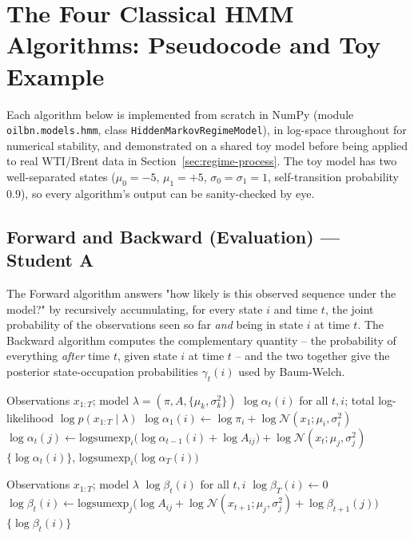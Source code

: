\section{The Four Classical HMM Algorithms: Pseudocode and Toy Example}
\label{sec:algorithms}

Each algorithm below is implemented from scratch in NumPy (module
\texttt{oilbn.models.hmm}, class \texttt{HiddenMarkovRegimeModel}), in
log-space throughout for numerical stability, and demonstrated on a
shared toy model before being applied to real WTI/Brent data in
Section~\ref{sec:regime-process}. The toy model has two well-separated states
($\mu_0=-5$, $\mu_1=+5$, $\sigma_0=\sigma_1=1$, self-transition
probability $0.9$), so every algorithm's output can be sanity-checked by
eye.

\subsection{Forward and Backward (Evaluation) --- Student A}

The Forward algorithm answers "how likely is this observed sequence
under the model?" by recursively accumulating, for every state $i$ and
time $t$, the joint probability of the observations seen so far
\emph{and} being in state $i$ at time $t$. The Backward algorithm
computes the complementary quantity -- the probability of everything
\emph{after} time $t$, given state $i$ at time $t$ -- and the two
together give the posterior state-occupation probabilities
$\gamma_t(i)$ used by Baum-Welch.

\begin{algorithm}[H]
\caption{Forward algorithm (log-space)}
\begin{algorithmic}[1]
\Require Observations $x_{1:T}$; model $\lambda = (\pi, A, \{\mu_k,\sigma_k^2\})$
\Ensure $\log\alpha_t(i)$ for all $t,i$; total log-likelihood $\log p(x_{1:T}\mid\lambda)$
  \State $\log\alpha_1(i) \gets \log\pi_i + \log\mathcal{N}(x_1;\mu_i,\sigma_i^2)$
\EndFor
{}
    \State $\log\alpha_t(j) \gets \mathrm{logsumexp}_i\bigl(\log\alpha_{t-1}(i) + \log A_{ij}\bigr) + \log\mathcal{N}(x_t;\mu_j,\sigma_j^2)$
  \EndFor
\EndFor
\State \Return $\{\log\alpha_t(i)\}$, $\mathrm{logsumexp}_i\bigl(\log\alpha_T(i)\bigr)$
\end{algorithmic}
\end{algorithm}

\begin{algorithm}[H]
\caption{Backward algorithm (log-space)}
\begin{algorithmic}[1]
\Require Observations $x_{1:T}$; model $\lambda$
\Ensure $\log\beta_t(i)$ for all $t,i$
  \State $\log\beta_T(i) \gets 0$
\EndFor
{}
    \State $\log\beta_t(i) \gets \mathrm{logsumexp}_j\bigl(\log A_{ij} + \log\mathcal{N}(x_{t+1};\mu_j,\sigma_j^2) + \log\beta_{t+1}(j)\bigr)$
  \EndFor
\EndFor
\State \Return $\{\log\beta_t(i)\}$
\end{algorithmic}
\end{algorithm}

